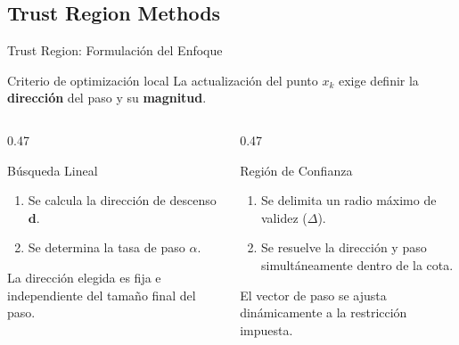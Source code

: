 \subsection{Trust Region Methods}


\begin{frame}{Trust Region: Formulación del Enfoque}
    \begin{block}{Criterio de optimización local}
        \small
        La actualización del punto \(x_k\) exige definir la \textbf{dirección} del paso y su \textbf{magnitud}.
    \end{block}

    \vspace{0.5em}
    \begin{columns}[T]
        \begin{column}{0.47\textwidth}
            \begin{exampleblock}{Búsqueda Lineal}
                \scriptsize
                \begin{enumerate}
                    \item Se calcula la dirección de descenso \(\mathbf{d}\).
                    \item Se determina la tasa de paso \(\alpha\).
                \end{enumerate}
                \vspace{0.3em}
                La dirección elegida es fija e independiente del tamaño final del paso.
            \end{exampleblock}
        \end{column}
        \begin{column}{0.47\textwidth}
            \begin{alertblock}{Región de Confianza}
                \scriptsize
                \begin{enumerate}
                    \item Se delimita un radio máximo de validez (\(\Delta\)).
                    \item Se resuelve la dirección y paso simultáneamente dentro de la cota.
                \end{enumerate}
                \vspace{0.3em}
                El vector de paso se ajusta dinámicamente a la restricción impuesta.
            \end{alertblock}
        \end{column}
    \end{columns}


\end{frame}
